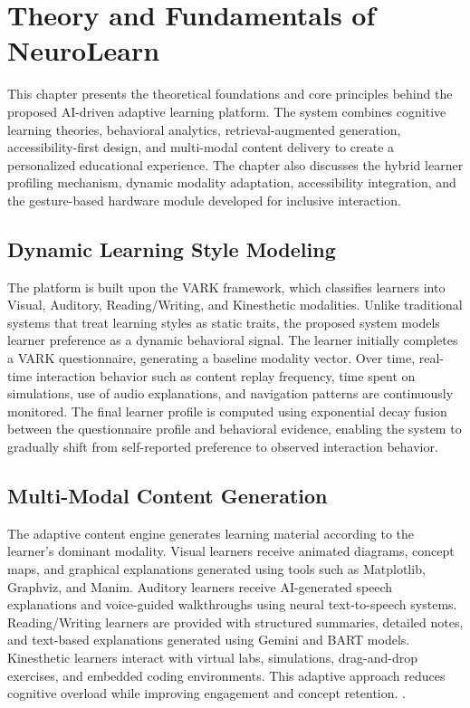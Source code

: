 \chapter{Theory and Fundamentals of NeuroLearn}

This chapter presents the theoretical foundations and core principles behind the proposed AI-driven adaptive learning platform. The system combines cognitive learning theories, behavioral analytics, retrieval-augmented generation, accessibility-first design, and multi-modal content delivery to create a personalized educational experience. The chapter also discusses the hybrid learner profiling mechanism, dynamic modality adaptation, accessibility integration, and the gesture-based hardware module developed for inclusive interaction.

\section{Dynamic Learning Style Modeling}

The platform is built upon the VARK framework, which classifies learners into Visual, Auditory, Reading/Writing, and Kinesthetic modalities. Unlike traditional systems that treat learning styles as static traits, the proposed system models learner preference as a dynamic behavioral signal. The learner initially completes a VARK questionnaire, generating a baseline modality vector. Over time, real-time interaction behavior such as content replay frequency, time spent on simulations, use of audio explanations, and navigation patterns are continuously monitored. The final learner profile is computed using exponential decay fusion between the questionnaire profile and behavioral evidence, enabling the system to gradually shift from self-reported preference to observed interaction behavior.

\section{Multi-Modal Content Generation}
The adaptive content engine generates learning material according to the learner’s dominant modality. Visual learners receive animated diagrams, concept maps, and graphical explanations generated using tools such as Matplotlib, Graphviz, and Manim. Auditory learners receive AI-generated speech explanations and voice-guided walkthroughs using neural text-to-speech systems. Reading/Writing learners are provided with structured summaries, detailed notes, and text-based explanations generated using Gemini and BART models. Kinesthetic learners interact with virtual labs, simulations, drag-and-drop exercises, and embedded coding environments. This adaptive approach reduces cognitive overload while improving engagement and concept retention.
. 
